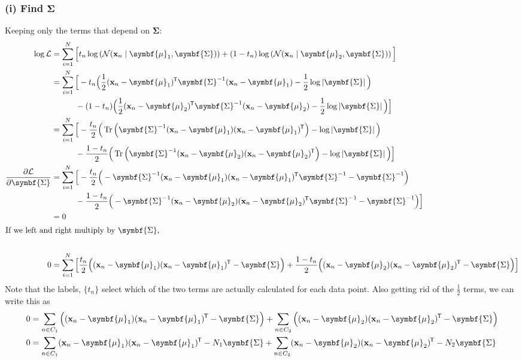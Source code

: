 \documentclass[11pt]{article}
\DeclareMathOperator{\Tr}{Tr}
\newcommand{\logdet}[1]{\log \left| {#1} \right| }
\newcommand{\xb}{\mathbf{x}}
\newcommand{\ub}{\symbf{\mu}}
\newcommand{\Sb}{\symbf{\Sigma}}
\newcommand*{\tran}{^{\mkern-1.5mu\mathsf{T}}}
\begin{document}
\begin{framed}
\subsubsection*{(i) Find $\Sb$}
Keeping only the terms that depend on $\Sb$:
\begin{align*}
	\log \mathcal{L} &=  \sum_{i=1}^{N} \Big[   t_n \log \left(\mathcal{N}(\xb_n \mid \ub_1, \Sb)\right)   +  (1 - t_n) \log \left(\mathcal{N}(\xb_n \mid \ub_2, \Sb)\right) \Big] \\
	& =  \sum_{i=1}^{N} \Big[   - t_n  \Big(\frac{1}{2} (\xb_n  - \ub_1)\tran \Sb^{-1} (\xb_n  - \ub_1)  - \frac{1}{2} \logdet{\Sb} \Big)   \\
	 & \quad \quad \quad  - (1 - t_n)  \Big( \frac{1}{2} (\xb_n  - \ub_2)\tran \Sb^{-1} (\xb_n  - \ub_2) - \frac{1}{2} \logdet{\Sb} \Big)  \Big]  \\
	 & =  \sum_{i=1}^{N} \Big[   -  \frac{t_n }{2} \Big( \Tr \Big(\Sb^{-1} (\xb_n  - \ub_1)  (\xb_n  - \ub_1)\tran \Big) - \logdet{\Sb} \Big)   \\
	 & \quad \quad \quad   - \frac{1 - t_n}{2}  \Big(   \Tr \Big(\Sb^{-1} (\xb_n  - \ub_2)  (\xb_n  - \ub_2)\tran \Big) - \logdet{\Sb} \Big)  \Big]  \\
	\frac{\partial \mathcal{L}}{\partial \Sb} &= 	  \sum_{i=1}^{N} \Big[   -  \frac{t_n }{2} \Big( - \Sb^{-1} (\xb_n  - \ub_1)  (\xb_n  - \ub_1)\tran \Sb^{-1}  - \Sb^{-1} \Big)   \\
	 & \quad \quad \quad   - \frac{1 - t_n}{2}  \Big(  - \Sb^{-1} (\xb_n  - \ub_2)  (\xb_n  - \ub_2)\tran \Sb^{-1} - \Sb^{-1} \Big)  \Big]  \\
	 & = 0 \\
\intertext{If we left and right multiply by $\Sb$,} \\
	0 &= \sum_{i=1}^{N} \Big[   \frac{t_n }{2} \Big(  (\xb_n  - \ub_1)  (\xb_n  - \ub_1)\tran  - \Sb \Big)   +  \frac{1 - t_n}{2}  \Big(  (\xb_n  - \ub_2)  (\xb_n  - \ub_2)\tran  - \Sb \Big)  \Big]
 \end{align*}
Note that the labels, $\lbrace t_n\rbrace$ select which of the two terms are actually calculated for each data point. Also getting rid of the $\frac{1}{2}$ terms, we can write this as
\begin{align*}
	0 &= \sum_{n \in C_1} \Big(  (\xb_n  - \ub_1)  (\xb_n  - \ub_1)\tran  - \Sb \Big)   +  \sum_{n \in C_2}  \Big(  (\xb_n  - \ub_2)  (\xb_n  - \ub_2)\tran  - \Sb \Big)  \\
	0 &= \sum_{n \in C_1} (\xb_n  - \ub_1)  (\xb_n  - \ub_1)\tran  - N_1 \Sb  + \sum_{n \in C_2}  (\xb_n  - \ub_2)  (\xb_n  - \ub_2)\tran  - N_2 \Sb   \\

\end{align*}
\end{framed}
\end{document}
